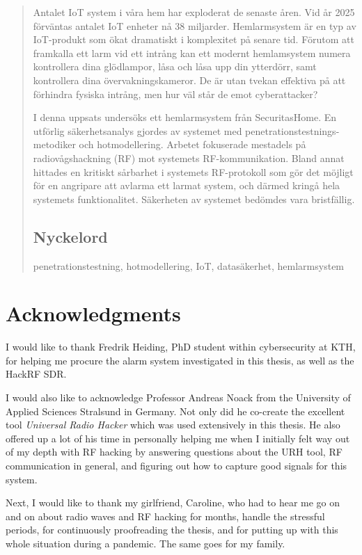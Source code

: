 \begin{abstract}
Antalet IoT system i våra hem har exploderat de senaste åren. Vid år 2025 förväntas antalet IoT enheter nå 38 miljarder. Hemlarmsystem är en typ av IoT-produkt som ökat dramatiskt i komplexitet på senare tid. Förutom att framkalla ett larm vid ett intrång kan ett modernt hemlamsystem numera kontrollera dina glödlampor, låsa och låsa upp din ytterdörr, samt kontrollera dina övervakningskameror. De är utan tvekan effektiva på att förhindra fysiska intrång, men hur väl står de emot cyberattacker?

I denna uppsats undersöks ett hemlarmsystem från SecuritasHome. En utförlig säkerhetsanalys gjordes av systemet med penetrationstestnings-metodiker och hotmodellering. Arbetet fokuserade mestadels på radiovågshackning (RF) mot systemets RF-kommunikation. Bland annat hittades en kritiskt sårbarhet i systemets RF-protokoll som gör det möjligt för en angripare att avlarma ett larmat system, och därmed kringå hela systemets funktionalitet. Säkerheten av systemet bedömdes vara bristfällig.

\subsection*{Nyckelord}
penetrationstestning, hotmodellering, IoT, datasäkerhet, hemlarmsystem

\end{abstract}

\clearpage

\section*{Acknowledgments}
I would like to thank Fredrik Heiding, PhD student within cybersecurity at KTH, for helping me procure the alarm system investigated in this thesis, as well as the HackRF SDR.

I would also like to acknowledge Professor Andreas Noack from the University of Applied Sciences Stralsund in Germany. Not only did he co-create the excellent tool \textit{Universal Radio Hacker} which was used extensively in this thesis. He also offered up a lot of his time in personally helping me when I initially felt way out of my depth with RF hacking by answering questions about the URH tool, RF communication in general, and figuring out how to capture good signals for this system.

Next, I would like to thank my girlfriend, Caroline, who had to hear me go on and on about radio waves and RF hacking for months, handle the stressful periods, for continuously proofreading the thesis, and for putting up with this whole situation during a pandemic. The same goes for my family.

